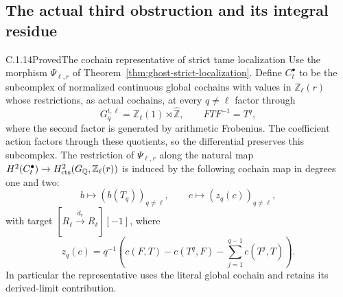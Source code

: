 \subsection{The actual third obstruction and its integral residue}
\label{sec:ghost-third-obstruction}

\begin{result}{C.1.14}{Proved}{The cochain representative of strict tame localization}
\label{prop:ghost-tame-cochain}
Use the morphism \(\Psi_{\ell,r}\) of
Theorem~\ref{thm:ghost-strict-localization}. Define
\(C_t^\bullet\) to be the subcomplex of normalized
continuous global cochains with values in
\(\mathbb Z_\ell(r)\) whose restrictions, as actual
cochains, at every \(q\ne\ell\) factor through
\[
 G_q^{t,\ell}=\mathbb Z_\ell(1)\rtimes\widehat{\mathbb Z},
       \qquad FT F^{-1}=T^q,
\]
where the second factor is generated by arithmetic Frobenius.
The coefficient action factors through these quotients,
so the differential preserves this subcomplex. The
restriction of \(\Psi_{\ell,r}\) along the natural map
\(H^2(C_t^\bullet)\to H^2_{\rm cts}
(G_{\mathbb Q},\mathbb Z_\ell(r))\) is induced by the
following cochain map in degrees one and two:
\[
 b\longmapsto (b(T_q))_{q\ne\ell},\qquad
 c\longmapsto (z_q(c))_{q\ne\ell},
\]
with target \([R_\ell\xrightarrow{d_r}R_\ell][-1]\),
where
\[
 z_q(c)=q^{-1}\left(c(F,T)-c(T^q,F)
                         -\sum_{j=1}^{q-1}c(T^j,T)\right).
\]
In particular the representative uses the literal global
cochain and retains its derived-limit contribution.
\end{result}
